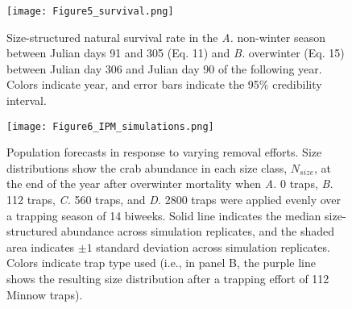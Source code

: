\documentclass{article}
\begin{document}
\begin{figure}[H]
    \centering
    \texttt{[image: Figure5\_survival.png]}
    \caption{Size-structured natural survival rate in the \textit{A.} non-winter season between Julian days 91 and 305 (Eq. 11) and \textit{B.} overwinter (Eq. 15) between Julian day 306 and Julian day 90 of the following year. Colors indicate year, and error bars indicate the 95\% credibility interval.}
\end{figure}

\begin{figure}[H]
    \centering
    \texttt{[image: Figure6\_IPM\_simulations.png]}
    \caption{Population forecasts in response to varying removal efforts. Size distributions show the crab abundance in each size class, $N_{size}$, at the end of the year after overwinter mortality when \textit{A.} 0 traps, \textit{B.} 112 traps, \textit{C.} 560 traps, and \textit{D.} 2800 traps were applied evenly over a trapping season of 14 biweeks. Solid line indicates the median size-structured abundance across simulation replicates, and the shaded area indicates $\pm1$ standard deviation across simulation replicates. Colors indicate trap type used (i.e., in panel B, the purple line shows the resulting size distribution after a trapping effort of 112 Minnow traps).}
\end{figure}

\printbibliography[]
\end{document}
